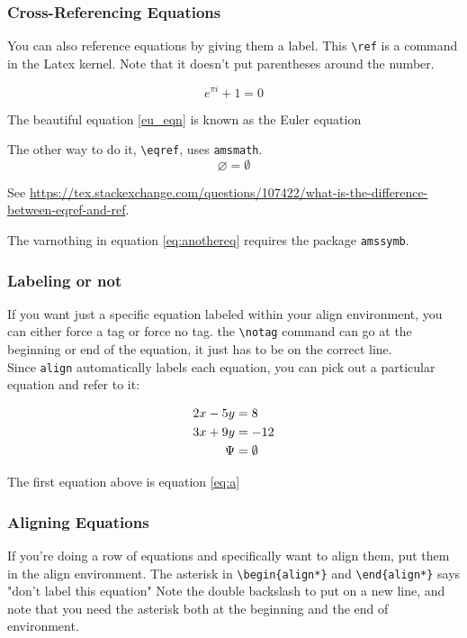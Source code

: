 \subsubsection{Cross-Referencing Equations}
You can also reference equations by giving them a label. 
This \verb+\ref+ is a command in the Latex kernel. Note that it doesn't put parentheses around the number.

\begin{equation} \label{eu_eqn}
	e^{\pi i} + 1 = 0
\end{equation}

The beautiful equation \ref{eu_eqn} is known as the Euler equation


The other way to do it, \verb+\eqref+, uses \verb+amsmath+.
\begin{equation} \label{eq:anothereq}
	\varnothing = \emptyset
\end{equation}

See \url{https://tex.stackexchange.com/questions/107422/what-is-the-difference-between-eqref-and-ref}.


The varnothing in equation \eqref{eq:anothereq} requires the package \verb+amssymb+.


\subsubsection{Labeling or not}
If you want just a specific equation labeled within your align environment, you can either force a tag or force no tag. the \verb+\notag+ command can go at the beginning or end of the equation, it just has to be on the correct line.\\

Since \verb+align+ automatically labels each equation, you can pick out a particular equation and refer to it: 

\begin{align} 
	2x - 5y 		&=  8 \label{eq:a}\\ 
	3x + 9y 		&=   -12 \notag \\
	\notag  \Psi 	&=  \emptyset  \\
\end{align}

The first equation above is equation \eqref{eq:a}

\subsubsection{Aligning Equations}
If you're doing a row of equations and specifically want to align them, put them in the align environment. The asterisk in \verb+\begin{align*}+ and \verb+\end{align*}+ says "don't label this equation" Note the double backslash to put on a new line, and note that you need the asterisk both at the beginning and the end of  environment.


